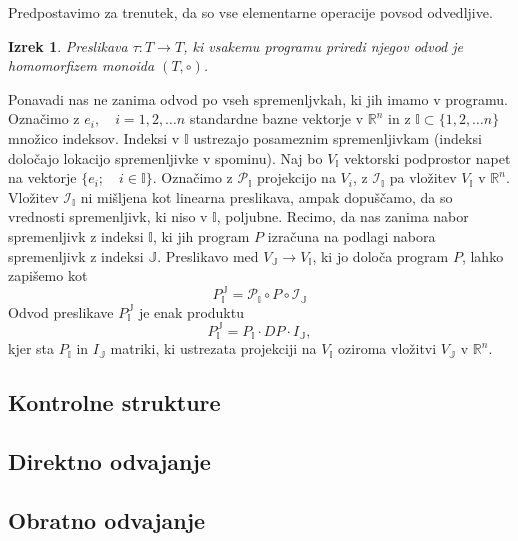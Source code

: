 \documentclass{article}
\newcommand{\RR}{\mathbb{R}}
\newcommand{\II}{\mathbb{I}}
\newcommand{\JJ}{\mathbb{J}}
\newtheorem{izrek}{Izrek}[section]
\begin{document}
Predpostavimo za trenutek, da so vse elementarne operacije povsod odvedljive. 

\begin{izrek}
  Preslikava $\tau:T\to T$, ki vsakemu programu priredi njegov odvod je
  homomorfizem monoida $(T,\circ)$. 
\end{izrek}
Ponavadi nas ne zanima odvod po vseh spremenljvkah, ki jih imamo v programu.
Označimo z $e_i,\quad i=1,2,\ldots n$ standardne bazne vektorje v $\RR^n$ in z
$\II\subset\{1,2,\ldots n\}$ množico indeksov. Indeksi v $\II$ ustrezajo
posameznim spremenljivkam (indeksi določajo lokacijo spremenljivke v spominu). Naj bo $V_\II$ vektorski
podprostor napet na vektorje $\{e_i;\quad i\in\II\}$. Označimo z 
$\mathcal{P}_\II$ projekcijo na $V_i$, z $\mathcal{I}_\II$ pa vložitev $V_\II$ v
$\RR^n$. Vložitev $\mathcal{I}_\II$ ni mišljena kot linearna preslikava, ampak
dopuščamo, da so vrednosti spremenljivk, ki niso v $\II$, poljubne. Recimo, da nas zanima nabor spremenljivk z indeksi $\II$, ki jih
program $P$ izračuna na podlagi nabora spremenljivk z indeksi $\mathbb{J}$.
Preslikavo med $V_\JJ\to V_\II$, ki jo določa program $P$, lahko zapišemo kot
\begin{equation}
  \label{eq:zozitev}
  P^{\JJ}_{\II}=\mathcal{P}_\II\circ P\circ \mathcal{I}_\JJ 
\end{equation}
Odvod preslikave $ P^{\JJ}_{\II}$ je enak produktu
\begin{equation*}
  P^{\JJ}_{\II}=P_\II\cdot DP\cdot I_\JJ,   
\end{equation*}
kjer sta $P_\II$ in  $I_\JJ$ matriki, ki ustrezata projekciji na $V_\II$ oziroma
vložitvi $V_\JJ$ v $\RR^n$.

\subsection{Kontrolne strukture}   
\subsection{Direktno odvajanje}
\subsection{Obratno odvajanje}
\end{document}
